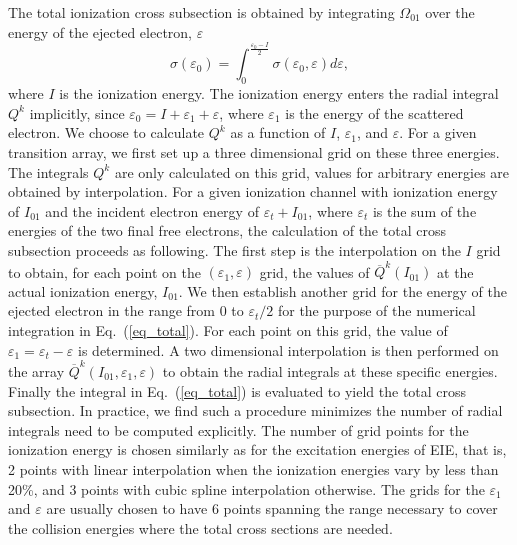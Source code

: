 The total ionization cross subsection is obtained by integrating $\Omega_{01}$
over the energy of the ejected electron, $\varepsilon$
\begin{equation}
\label{eq_total}
\sigma(\varepsilon_0) = \int\nolimits_0^{\frac{\varepsilon_0-I}{2}}
\sigma(\varepsilon_0,\varepsilon) d\varepsilon,
\end{equation}
where $I$ is the ionization energy. The ionization energy enters the
radial integral $Q^k$ implicitly, since $\varepsilon_0 =
I+\varepsilon_1+\varepsilon$, where $\varepsilon_1$ is the energy of the
scattered electron. We choose to calculate $Q^k$ as a function of $I$,
$\varepsilon_1$, and $\varepsilon$. For a given transition array, we first set
up a three dimensional grid on these three energies. The integrals $Q^k$ are 
only calculated on this grid, values for arbitrary energies are obtained by
interpolation. For a given ionization channel with
ionization energy of $I_{01}$ and the incident electron energy of
$\varepsilon_t + I_{01}$, where $\varepsilon_t$ is the sum of the energies of
the two final free electrons, the calculation of the total cross subsection
proceeds as 
following. The first step is the interpolation on the $I$ grid to obtain, for
each point on the $(\varepsilon_1,\varepsilon)$ grid, the values of
$\overline{Q}^k(I_{01})$ at the actual ionization energy, $I_{01}$. We then
establish another grid for the energy of the ejected electron in the range 
from 0 to $\varepsilon_t/2$ for the purpose of the numerical integration in
Eq.~(\ref{eq_total}). For each 
point on this grid, the value of $\varepsilon_1 = \varepsilon_t-\varepsilon$
is determined. A two dimensional interpolation is then performed on the array
$\overline{Q}^k(I_{01},\varepsilon_1,\varepsilon)$ to obtain the radial
integrals at these specific 
energies. Finally the integral in Eq.~(\ref{eq_total}) is evaluated to
yield the total cross subsection. In practice, we find such a procedure
minimizes the number of radial integrals need to be computed explicitly. The
number of grid points for the ionization energy is chosen similarly as for the
excitation energies of EIE, that is, 2 points with linear interpolation when
the ionization energies vary by less than 20\%, and 3 points with cubic spline
interpolation otherwise. The grids for the $\varepsilon_1$ and $\varepsilon$
are usually chosen to have 6 points spanning the range necessary to cover the
collision energies where the total cross sections are needed.

